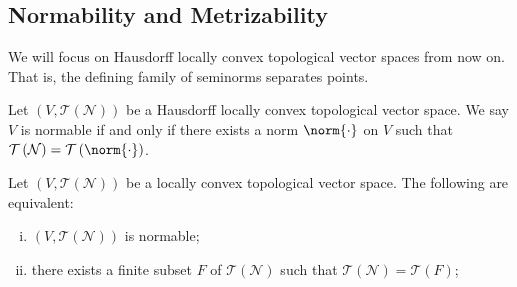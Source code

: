 \documentclass[10pt]{mypackage}
\begin{document}
\subsection{Normability and Metrizability}%
We will focus on Hausdorff locally convex topological vector spaces from now on. That is, the defining family of seminorms separates points.
\begin{definition}
  Let $\left( V,\mathcal{T}\left( \mathcal{N} \right) \right)$ be a Hausdorff locally convex topological vector space. We say $ V $ is normable if and only if there exists a norm $\norm{\cdot}$ on $V$ such that $ \mathcal{T}\left( \mathcal{N} \right) = \mathcal{T}\left( \norm{\cdot} \right) $.
\end{definition}
\begin{theorem}
  Let $\left( V,\mathcal{T}\left( \mathcal{N} \right) \right)$ be a locally convex topological vector space. The following are equivalent:
  \begin{enumerate}[(i)]
    \item $\left( V,\mathcal{T}\left( \mathcal{N} \right) \right)$ is normable;
    \item there exists a finite subset $F$ of $\mathcal{T}\left( \mathcal{N} \right)$ such that $\mathcal{T}\left( \mathcal{N} \right) = \mathcal{T}\left( F \right)$;
  \end{enumerate}
\end{theorem}
\end{document}
